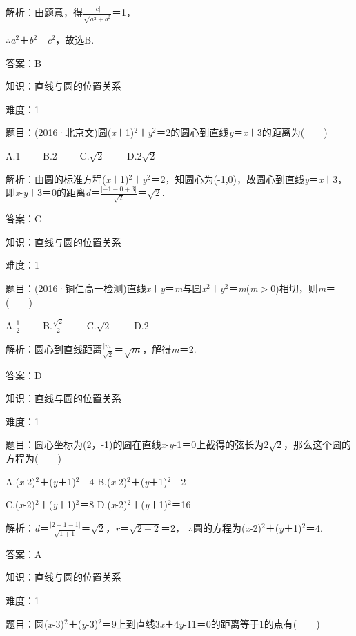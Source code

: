 \documentclass{article} %
\begin{document}
解析：由题意，得$\frac{|c|}{\sqrt{a^2+b^2}}$＝1，

$\mathrm{\therefore}$\textit{a}${}^{2}$＋\textit{b}${}^{2}$＝\textit{c}${}^{2}$，故选B.

答案：B

知识：直线与圆的位置关系

难度：1

题目：(2016·北京文)圆(\textit{x}＋1)${}^{2}$＋\textit{y}${}^{2}$＝2的圆心到直线\textit{y}＝\textit{x}＋3的距离为(　　)

A.1　　 B.2　　 C.$\sqrt{2}$　　 D.$2\sqrt{2}$

解析：由圆的标准方程(\textit{x}＋1)${}^{2}$＋\textit{y}${}^{2}$＝2，知圆心为(-1,0)，故圆心到直线\textit{y}＝\textit{x}＋3，即\textit{x}-\textit{y}＋3＝0的距离\textit{d}＝$\frac{|-1-0+3|}{\sqrt{2}}$＝$\sqrt{2}$.

答案：C

知识：直线与圆的位置关系

难度：1

题目：(2016·铜仁高一检测)直线\textit{x}＋\textit{y}＝\textit{m}与圆\textit{x}${}^{2}$＋\textit{y}${}^{2}$＝\textit{m}(\textit{m}$\mathrm{>}$0)相切，则\textit{m}＝(　　)

A.$\frac{1}{2}$　　 B.$\frac{\sqrt{2}}{2}$　　 C.$\sqrt{2}$　　 D.2

解析：圆心到直线距离$\frac{|m|}{\sqrt{2}}$＝$\sqrt{m}$，解得\textit{m}＝2.

答案：D

知识：直线与圆的位置关系

难度：1

题目：圆心坐标为(2，-1)的圆在直线\textit{x}-\textit{y}-1＝0上截得的弦长为$2\sqrt{2}$，那么这个圆的方程为(　　)

A.(\textit{x}-2)${}^{2}$＋(\textit{y}＋1)${}^{2}$＝4 B.(\textit{x}-2)${}^{2}$＋(\textit{y}＋1)${}^{2}$＝2

C.(\textit{x}-2)${}^{2}$＋(\textit{y}＋1)${}^{2}$＝8 D.(\textit{x}-2)${}^{2}$＋(\textit{y}＋1)${}^{2}$＝16

解析：\textit{d}＝$\frac{|2+1-1|}{\sqrt{1+1}}$＝$\sqrt{2}$，\textit{r}＝$\sqrt{2+2}$＝2，
$\mathrm{\therefore}$圆的方程为(\textit{x}-2)${}^{2}$＋(\textit{y}＋1)${}^{2}$＝4.

答案：A

知识：直线与圆的位置关系

难度：1

题目：圆(\textit{x}-3)${}^{2}$＋(\textit{y}-3)${}^{2}$＝9上到直线3\textit{x}＋4\textit{y}-11＝0的距离等于1的点有(　　)
\end{document}
